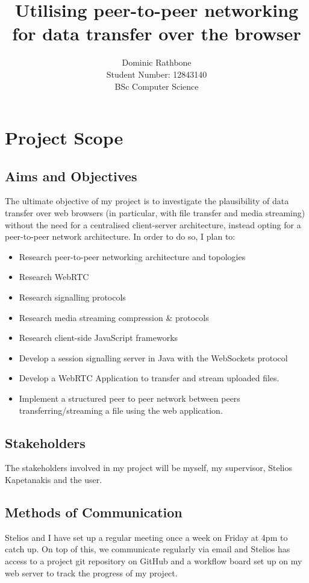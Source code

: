 \documentclass[]{report}
\title{Utilising peer-to-peer networking for data transfer over the browser}
\author{Dominic Rathbone \\ Student Number: 12843140 \\ BSc Computer Science}
\begin{document}
\maketitle
\tableofcontents

\chapter{Project Scope}
\section{Aims and Objectives}
	The ultimate objective of my project is to investigate the plausibility of data transfer over web browsers (in particular, with file transfer and media streaming) without the need for a centralised client-server architecture, instead opting for a peer-to-peer network architecture. In order to do so, I plan to:
	\begin{itemize}
		\item Research peer-to-peer networking architecture and topologies
		\item Research WebRTC
		\item Research signalling protocols
		\item Research media streaming compression \& protocols
		\item Research client-side JavaScript frameworks
		\item Develop a session signalling server in Java with the WebSockets protocol
		\item Develop a WebRTC Application to transfer and stream uploaded files.
		\item Implement a structured peer to peer network between peers transferring/streaming a file using the web application.
	\end{itemize}
\section{Stakeholders}
	The stakeholders involved in my project will be myself, my supervisor, Stelios Kapetanakis and the user.
\section{Methods of Communication}
	Stelios and I have set up a regular meeting once a week on Friday at 4pm to catch up. On top of this, we communicate regularly via email and Stelios has access to a project git repository on GitHub and a workflow board set up on my web server to track the progress of my project. 
	
\end{document}
